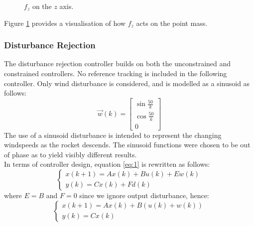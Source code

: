 \documentclass[conference, tikz]{IEEEtran}
\begin{document}
\begin{figure}[H]
\centering
{}
\caption{$f_z$ on the $z$ axis.} \label{tikz:axes}
\end{figure}

Figure \ref{tikz:axes} provides a visualisation of how $f_z$ acts on the point mass. 



\subsubsection{Disturbance Rejection}
The disturbance rejection controller builds on both the unconstrained and constrained controllers. No reference tracking is included in the following controller. 
Only wind disturbance is considered, and is modelled as a sinusoid as follows:
\[
    \vec{w}(k)
    =
    \begin{bmatrix}
        \sin{\frac{50}{k}}\\
        \cos{\frac{50}{k}}\\
        0
    \end{bmatrix}
\]
The use of a sinusoid disturbance is intended to represent the changing windspeeds as the rocket descends. The sinusoid functions were chosen to be out of phase as to yield visibly different results. 
\\
In terms of controller design, equation \ref{eq:1} is rewritten as follows:
\[
    \begin{cases}
    x(k+1) = Ax(k) + Bu(k) + Ew(k)\\
    y(k) = Cx(k) + Fd(k)
    \end{cases}
\]
where $E = B$ and $F=0$ since we ignore output disturbance, hence:
\[
    \begin{cases}
        x(k+1) = Ax(k) + B(u(k) + w(k))\\
        y(k) = Cx(k)
    \end{cases}
\]
\end{document}
